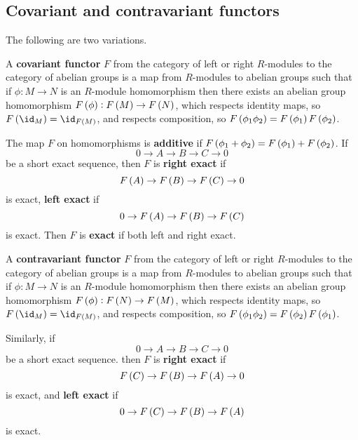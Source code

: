 \subsection{Covariant and contravariant functors}


The following are two variations.

\begin{definition}
A \textbf{covariant functor} $ F $ from the category of left or right $ R $-modules to the category of abelian groups is a map from $ R $-modules to abelian groups such that if $ \phi : M \to N $ is an $ R $-module homomorphism then there exists an abelian group homomorphism $ F\br{\phi} : F\br{M} \to F\br{N} $, which respects identity maps, so $ F\br{\id_M} = \id_{F\br{M}} $, and respects composition, so $ F\br{\phi_1\phi_2} = F\br{\phi_1}F\br{\phi_2} $.
\end{definition}

The map $ F $ on homomorphisms is \textbf{additive} if $ F\br{\phi_1 + \phi_2} = F\br{\phi_1} + F\br{\phi_2} $. If
$$ 0 \to A \to B \to C \to 0 $$
be a short exact sequence, then $ F $ is \textbf{right exact} if
$$ F\br{A} \to F\br{B} \to F\br{C} \to 0 $$
is exact, \textbf{left exact} if
$$ 0 \to F\br{A} \to F\br{B} \to F\br{C} $$
is exact. Then $ F $ is \textbf{exact} if both left and right exact.

\begin{definition}
A \textbf{contravariant functor} $ F $ from the category of left or right $ R $-modules to the category of abelian groups is a map from $ R $-modules to abelian groups such that if $ \phi : M \to N $ is an $ R $-module homomorphism then there exists an abelian group homomorphism $ F\br{\phi} : F\br{N} \to F\br{M} $, which respects identity maps, so $ F\br{\id_M} = \id_{F\br{M}} $, and respects composition, so $ F\br{\phi_1\phi_2} = F\br{\phi_2}F\br{\phi_1} $.
\end{definition}

Similarly, if
$$ 0 \to A \to B \to C \to 0 $$
be a short exact sequence. then $ F $ is \textbf{right exact} if
$$ F\br{C} \to F\br{B} \to F\br{A} \to 0 $$
is exact, and \textbf{left exact} if
$$ 0 \to F\br{C} \to F\br{B} \to F\br{A} $$
is exact.

